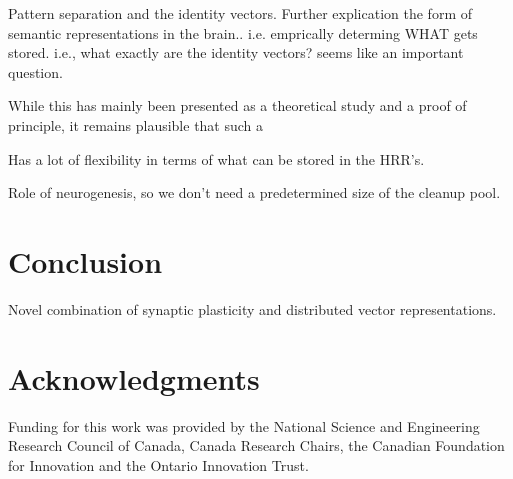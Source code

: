 \documentclass[10pt,letterpaper]{article}
\begin{document}
Pattern separation and the identity vectors.
Further explication the form of semantic representations in the brain.. i.e. emprically determing WHAT gets stored. i.e., what exactly are the identity vectors? seems like an important question.

While this has mainly been presented as a theoretical study and a proof of principle, it remains plausible that such a 

Has a lot of flexibility in terms of what can be stored in the HRR's.

Role of neurogenesis, so we don't need a predetermined size of the cleanup pool. 



\section{Conclusion}
Novel combination of synaptic plasticity and distributed vector representations. 

\section{Acknowledgments}
Funding for this work was provided by the National Science and Engineering Research Council of Canada, Canada Research Chairs, the Canadian Foundation for Innovation and the Ontario Innovation Trust.		


\setlength{\bibleftmargin}{.125in}
\setlength{\bibindent}{-\bibleftmargin}


\end{document}

